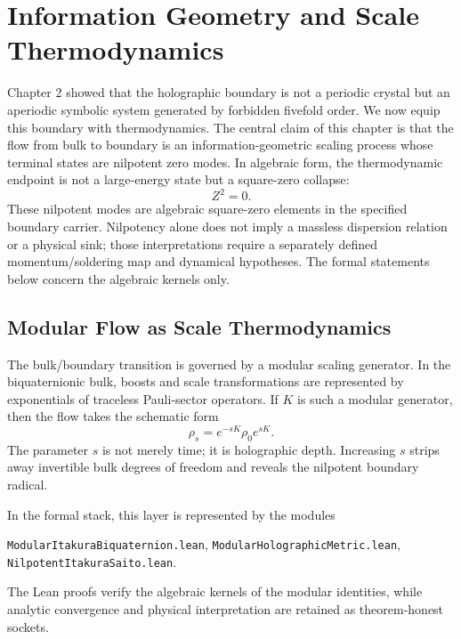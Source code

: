 \chapter{Information Geometry and Scale Thermodynamics}

Chapter 2 showed that the holographic boundary is not a periodic crystal but an aperiodic symbolic system generated by forbidden fivefold order.  We now equip this boundary with thermodynamics.  The central claim of this chapter is that the flow from bulk to boundary is an information-geometric scaling process whose terminal states are nilpotent zero modes.  In algebraic form, the thermodynamic endpoint is not a large-energy state but a square-zero collapse:
\begin{equation}
    Z^2=0.
\end{equation}
These nilpotent modes are algebraic square-zero elements in the specified boundary carrier. Nilpotency alone does not imply a massless dispersion relation or a physical sink; those interpretations require a separately defined momentum/soldering map and dynamical hypotheses. The formal statements below concern the algebraic kernels only.

\section{Modular Flow as Scale Thermodynamics}

The bulk/boundary transition is governed by a modular scaling generator.  In the biquaternionic bulk, boosts and scale transformations are represented by exponentials of traceless Pauli-sector operators.  If $K$ is such a modular generator, then the flow takes the schematic form
\begin{equation}
    \rho_s = e^{-sK}\rho_0 e^{sK}.
\end{equation}
The parameter $s$ is not merely time; it is holographic depth.  Increasing $s$ strips away invertible bulk degrees of freedom and reveals the nilpotent boundary radical.

In the formal stack, this layer is represented by the modules
\begin{center}
\texttt{ModularItakuraBiquaternion.lean},\quad
\texttt{ModularHolographicMetric.lean},\quad
\texttt{NilpotentItakuraSaito.lean}.
\end{center}
The Lean proofs verify the algebraic kernels of the modular identities, while analytic convergence and physical interpretation are retained as theorem-honest sockets.

